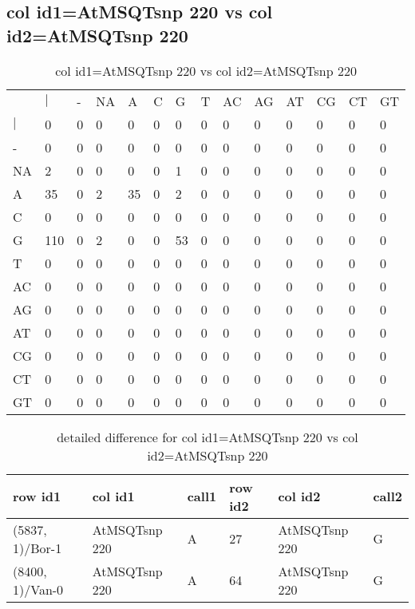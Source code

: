 \subsection{col id1=AtMSQTsnp 220 vs col id2=AtMSQTsnp 220}
\begin{center}
\begin{longtable}{|l|l|l|l|l|l|l|l|l|l|l|l|l|l|}
\caption{col id1=AtMSQTsnp 220 vs col id2=AtMSQTsnp 220} \label{table_dm582}\\
\hline
\\
\hline
&$|$&-&NA&A&C&G&T&AC&AG&AT&CG&CT&GT\\
$|$&0&0&0&0&0&0&0&0&0&0&0&0&0\\
-&0&0&0&0&0&0&0&0&0&0&0&0&0\\
NA&2&0&0&0&0&1&0&0&0&0&0&0&0\\
A&35&0&2&35&0&2&0&0&0&0&0&0&0\\
C&0&0&0&0&0&0&0&0&0&0&0&0&0\\
G&110&0&2&0&0&53&0&0&0&0&0&0&0\\
T&0&0&0&0&0&0&0&0&0&0&0&0&0\\
AC&0&0&0&0&0&0&0&0&0&0&0&0&0\\
AG&0&0&0&0&0&0&0&0&0&0&0&0&0\\
AT&0&0&0&0&0&0&0&0&0&0&0&0&0\\
CG&0&0&0&0&0&0&0&0&0&0&0&0&0\\
CT&0&0&0&0&0&0&0&0&0&0&0&0&0\\
GT&0&0&0&0&0&0&0&0&0&0&0&0&0\\
\hline
\end{longtable}
\end{center}

\begin{center}
\begin{longtable}{|l|l|l|l|l|l|}
\caption{detailed difference for col id1=AtMSQTsnp 220 vs col id2=AtMSQTsnp 220} \label{table_dm583}\\
\hline
row id1&col id1&call1&row id2&col id2&call2\\
\hline
(5837, 1)/Bor-1&AtMSQTsnp 220&A&27&AtMSQTsnp 220&G\\
(8400, 1)/Van-0&AtMSQTsnp 220&A&64&AtMSQTsnp 220&G\\
\hline
\end{longtable}
\end{center}


